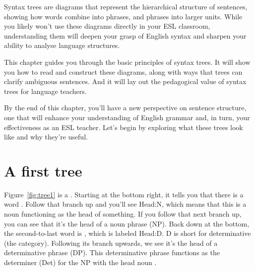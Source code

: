 Syntax trees are diagrams that represent the hierarchical structure of sentences, showing how words combine into phrases, and phrases into larger units. While you likely won't use these diagrams directly in your ESL classroom, understanding them will deepen your grasp of English syntax and sharpen your ability to analyse language structures.


This chapter guides you through the basic principles of syntax trees. It will show you how to read and construct these diagrams, along with ways that trees can clarify ambiguous sentences. And it will lay out the pedagogical value of syntax trees for language teachers.

By the end of this chapter, you'll have a new perspective on sentence structure, one that will enhance your understanding of English grammar and, in turn, your effectiveness as an ESL teacher. Let's begin by exploring what these trees look like and why they're useful.





\section{A first tree}

Figure~\ref{fig:tree1} is a . Starting at the bottom right, it tells you that there is a word . Follow that branch up and you'll see Head:N, which means that this is a noun functioning as the head of something. If you follow that next branch up, you can see that it's the head of a noun phrase (NP). Back down at the bottom, the second-to-last word is , which is labeled Head:D. D is short for determinative (the category). Following its branch upwards, we see it's the head of a determinative phrase (DP). This determinative phrase functions as the determiner (Det) for the NP with the head noun .

